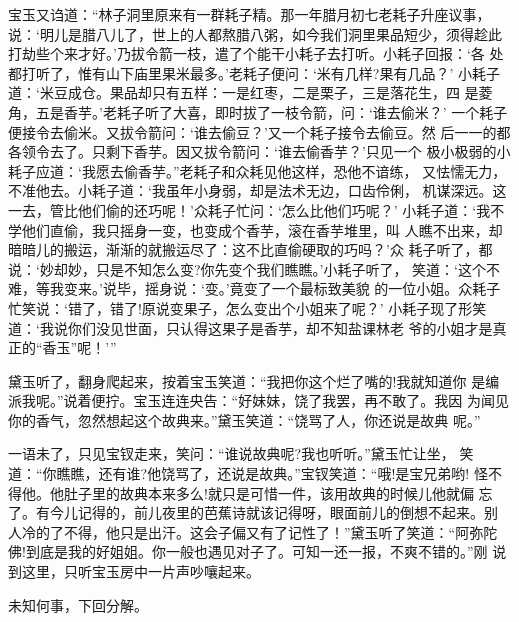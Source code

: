 宝玉又诌道：“林子洞里原来有一群耗子精。那一年腊月初七老耗子升座议事，
说：‘明儿是腊八儿了，世上的人都熬腊八粥，如今我们洞里果品短少，须得趁此
打劫些个来才好。’乃拔令箭一枝，遣了个能干小耗子去打听。小耗子回报：‘各
处都打听了，惟有山下庙里果米最多。’老耗子便问：‘米有几样?果有几品？’
小耗子道：‘米豆成仓。果品却只有五样：一是红枣，二是栗子，三是落花生，四
是菱角，五是香芋。’老耗子听了大喜，即时拔了一枝令箭，问：‘谁去偷米？’
一个耗子便接令去偷米。又拔令箭问：‘谁去偷豆？’又一个耗子接令去偷豆。然
后一一的都各领令去了。只剩下香芋。因又拔令箭问：‘谁去偷香芋？’只见一个
极小极弱的小耗子应道：‘我愿去偷香芋。”老耗子和众耗见他这样，恐他不谙练，
又怯懦无力，不准他去。小耗子道：‘我虽年小身弱，却是法术无边，口齿伶俐，
机谋深远。这一去，管比他们偷的还巧呢！’众耗子忙问：‘怎么比他们巧呢？’
小耗子道：‘我不学他们直偷，我只摇身一变，也变成个香芋，滚在香芋堆里，叫
人瞧不出来，却暗暗儿的搬运，渐渐的就搬运尽了：这不比直偷硬取的巧吗？’众
耗子听了，都说：‘妙却妙，只是不知怎么变?你先变个我们瞧瞧。’小耗子听了，
笑道：‘这个不难，等我变来。’说毕，摇身说：‘变。’竟变了一个最标致美貌
的一位小姐。众耗子忙笑说：‘错了，错了!原说变果子，怎么变出个小姐来了呢？’
小耗子现了形笑道：‘我说你们没见世面，只认得这果子是香芋，却不知盐课林老
爷的小姐才是真正的“香玉”呢！’”

黛玉听了，翻身爬起来，按着宝玉笑道：“我把你这个烂了嘴的!我就知道你
是编派我呢。”说着便拧。宝玉连连央告：“好妹妹，饶了我罢，再不敢了。我因
为闻见你的香气，忽然想起这个故典来。”黛玉笑道：“饶骂了人，你还说是故典
呢。”

一语未了，只见宝钗走来，笑问：“谁说故典呢?我也听听。”黛玉忙让坐，
笑道：“你瞧瞧，还有谁?他饶骂了，还说是故典。”宝钗笑道：“哦!是宝兄弟哟!
怪不得他。他肚子里的故典本来多么!就只是可惜一件，该用故典的时候儿他就偏
忘了。有今儿记得的，前儿夜里的芭蕉诗就该记得呀，眼面前儿的倒想不起来。别
人冷的了不得，他只是出汗。这会子偏又有了记性了！”黛玉听了笑道：“阿弥陀
佛!到底是我的好姐姐。你一般也遇见对子了。可知一还一报，不爽不错的。”刚
说到这里，只听宝玉房中一片声吵嚷起来。

未知何事，下回分解。